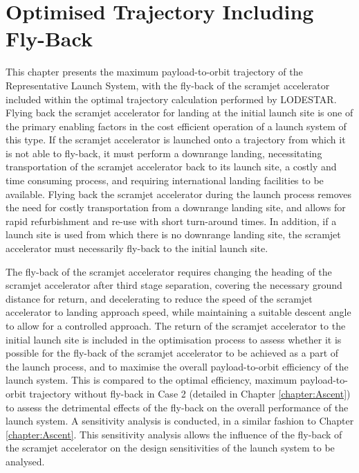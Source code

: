 \cleardoublepage
\chapter{Optimised Trajectory Including Fly-Back}\label{chapter:Flyback}
	
This chapter presents the maximum payload-to-orbit trajectory of the Representative Launch System, with the fly-back of the scramjet accelerator included within the optimal trajectory calculation performed by LODESTAR. 
Flying back the scramjet accelerator for landing at the initial launch site is one of the primary enabling factors in the cost efficient operation of a launch system of this type. If the scramjet accelerator is launched onto a trajectory from which it is not able to fly-back, it must perform a downrange landing, necessitating transportation of the scramjet accelerator back to its launch site, a costly and time consuming process, and requiring international landing facilities to be available. 
Flying back the scramjet accelerator during the launch process removes the need for costly transportation from a downrange landing site, and allows for rapid refurbishment and re-use with short turn-around times.
In addition, if a launch site is used from which there is no downrange landing site, the scramjet accelerator must necessarily fly-back to the initial launch site. 

The fly-back of the scramjet accelerator requires changing the heading of the scramjet accelerator after third stage separation, covering the necessary ground distance for return, and decelerating to reduce the speed of the scramjet accelerator to landing approach speed, while maintaining a suitable descent angle to allow for a controlled approach. 
The return of the scramjet accelerator to the initial launch site is included in the optimisation process to assess whether it is possible for the fly-back of the scramjet accelerator to be achieved as a part of the launch process, and to maximise the overall payload-to-orbit efficiency of the launch system. This is compared to the optimal efficiency, maximum payload-to-orbit trajectory without fly-back in Case 2 (detailed in Chapter \ref{chapter:Ascent}) to assess the detrimental effects of the fly-back on the overall performance of the launch system. 
A sensitivity analysis is conducted, in a similar fashion to Chapter \ref{chapter:Ascent}. 
This sensitivity analysis allows the influence of the fly-back of the scramjet accelerator on the design sensitivities of the launch system to be analysed.


